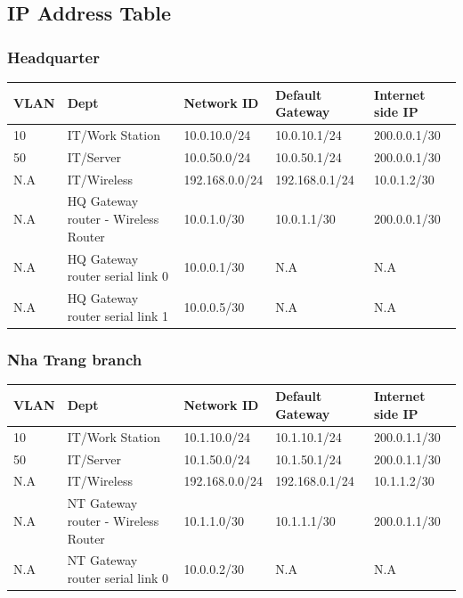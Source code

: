 \subsection{IP Address Table}
\subsubsection{Headquarter}
\begin{center}
  \begin{tabular}{|p{}|p{}|p{}|p{}|p{}|}
    \hline
    VLAN & Dept                                & Network ID     & Default Gateway & Internet side IP \\
    \hline
    10   & IT/Work Station                     & 10.0.10.0/24   & 10.0.10.1/24    & 200.0.0.1/30     \\
    \hline
    50   & IT/Server                           & 10.0.50.0/24   & 10.0.50.1/24    & 200.0.0.1/30     \\
    \hline
    N.A  & IT/Wireless                         & 192.168.0.0/24 & 192.168.0.1/24  & 10.0.1.2/30      \\
    \hline
    N.A  & HQ Gateway router - Wireless Router
         & 10.0.1.0/30
         & 10.0.1.1/30
         & 200.0.0.1/30
    \\
    \hline
    N.A  & HQ Gateway router serial link 0
         & 10.0.0.1/30
         & N.A
         & N.A                                                                                       \\
    \hline
    N.A  & HQ Gateway router serial link 1
         & 10.0.0.5/30
         & N.A
         & N.A
    \\
    \hline
  \end{tabular}
\end{center}
\subsubsection{Nha Trang branch}
\begin{center}
  \begin{tabular}{|p{}|p{}|p{}|p{}|p{}|}
    \hline
    VLAN & Dept                                & Network ID & Default Gateway & Internet side IP \\
    \hline
    10   & IT/Work Station
         & 10.1.10.0/24
         & 10.1.10.1/24
         & 200.0.1.1/30
    \\
    \hline
    50   & IT/Server
         & 10.1.50.0/24
         & 10.1.50.1/24
         & 200.0.1.1/30
    \\
    \hline
    N.A  & IT/Wireless
         & 192.168.0.0/24
         & 192.168.0.1/24
         & 10.1.1.2/30
    \\
    \hline
    N.A  & NT Gateway router - Wireless Router
         & 10.1.1.0/30
         & 10.1.1.1/30
         & 200.0.1.1/30
    \\
    \hline
    N.A  & NT Gateway router serial link 0
         & 10.0.0.2/30
         & N.A
         & N.A
    \\
    \hline
  \end{tabular}
\end{center}

